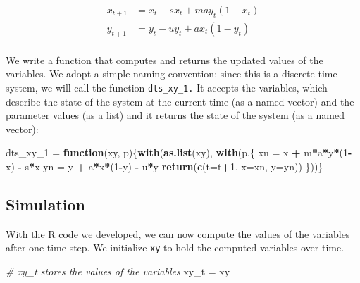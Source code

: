 \documentclass[
]{book}
\newenvironment{Shaded}{\begin{snugshade}}{\end{snugshade}}
\newcommand{\AttributeTok}[1]{\textcolor[rgb]{0.13,0.29,0.53}{#1}}
\newcommand{\CommentTok}[1]{\textcolor[rgb]{0.56,0.35,0.01}{\textit{#1}}}
\newcommand{\ControlFlowTok}[1]{\textcolor[rgb]{0.13,0.29,0.53}{\textbf{#1}}}
\newcommand{\DecValTok}[1]{\textcolor[rgb]{0.00,0.00,0.81}{#1}}
\newcommand{\FunctionTok}[1]{\textcolor[rgb]{0.13,0.29,0.53}{\textbf{#1}}}
\newcommand{\NormalTok}[1]{#1}
\newcommand{\OtherTok}[1]{\textcolor[rgb]{0.56,0.35,0.01}{#1}}
\newcommand{\SpecialCharTok}[1]{\textcolor[rgb]{0.81,0.36,0.00}{\textbf{#1}}}
\begin{document}
\[\begin{array}{rl}
x_{t+1} &=  x_t - s x_t + m a y_t (1-x_t)  \\ 
y_{t+1} &=  y_t - u y_t + a x_t (1 - y_t) \\ 
\end{array}\]

We write a function that computes and returns the updated values of the variables. We adopt a simple naming convention: since this is a discrete time system, we will call the function \texttt{dts\_xy\_1.} It accepts the variables, which describe the state of the system at the current time (as a named vector) and the parameter values (as a list) and it returns the state of the system (as a named vector):

\begin{Shaded}
\begin{Highlighting}[]
\NormalTok{dts\_xy\_1 }\OtherTok{=} \ControlFlowTok{function}\NormalTok{(xy, p)\{}\FunctionTok{with}\NormalTok{(}\FunctionTok{as.list}\NormalTok{(xy), }\FunctionTok{with}\NormalTok{(p,\{}
\NormalTok{  xn }\OtherTok{=}\NormalTok{ x }\SpecialCharTok{+}\NormalTok{ m}\SpecialCharTok{*}\NormalTok{a}\SpecialCharTok{*}\NormalTok{y}\SpecialCharTok{*}\NormalTok{(}\DecValTok{1}\SpecialCharTok{{-}}\NormalTok{x) }\SpecialCharTok{{-}}\NormalTok{ s}\SpecialCharTok{*}\NormalTok{x}
\NormalTok{  yn }\OtherTok{=}\NormalTok{ y }\SpecialCharTok{+}\NormalTok{ a}\SpecialCharTok{*}\NormalTok{x}\SpecialCharTok{*}\NormalTok{(}\DecValTok{1}\SpecialCharTok{{-}}\NormalTok{y) }\SpecialCharTok{{-}}\NormalTok{ u}\SpecialCharTok{*}\NormalTok{y}
  \FunctionTok{return}\NormalTok{(}\FunctionTok{c}\NormalTok{(}\AttributeTok{t=}\NormalTok{t}\SpecialCharTok{+}\DecValTok{1}\NormalTok{, }\AttributeTok{x=}\NormalTok{xn, }\AttributeTok{y=}\NormalTok{yn))}
\NormalTok{\}))\}}
\end{Highlighting}
\end{Shaded}

\subsection{Simulation}\label{simulation}

With the R code we developed, we can now compute the values of the variables after one time step. We initialize \texttt{xy} to hold the computed variables over time.

\begin{Shaded}
\begin{Highlighting}[]
\CommentTok{\# xy\_t stores the values of the variables}
\NormalTok{xy\_t }\OtherTok{=}\NormalTok{ xy }
\end{Highlighting}
\end{Shaded}
\end{document}
